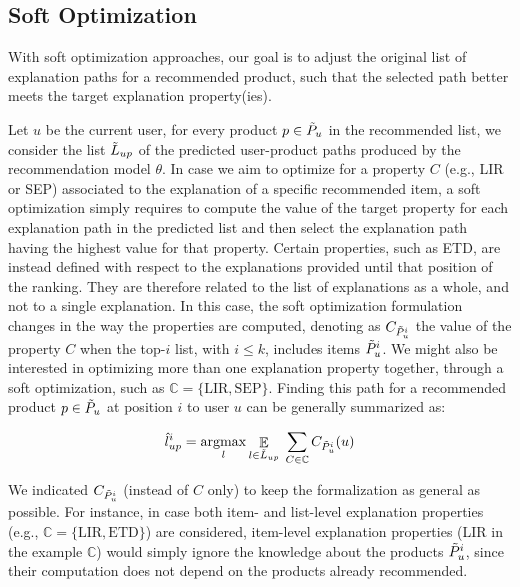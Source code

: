 \documentclass[sigconf]{acmart}
\begin{document}
\subsection{Soft Optimization}
With soft optimization approaches, our goal is to adjust the original list of explanation paths for a recommended product, such that the selected path better meets the target explanation property(ies).

Let $u$ be the current user, for every product $p \in \Tilde{P}_u$ in the recommended list, we consider the list $\Tilde{L}_{up}$ of the predicted user-product paths produced by the recommendation model $\theta$.
In case we aim to optimize for a property $C$ (e.g., LIR or SEP) associated to the explanation of a specific recommended item, a soft optimization simply requires to compute the value of the target property for each explanation path in the predicted list and then select the explanation path having the highest value for that property.
Certain properties, such as ETD, are instead defined with respect to the explanations provided until that position of the ranking.
They are therefore related to the list of explanations as a whole, and not to a single explanation.  
In this case, the soft optimization formulation changes in the way the properties are computed, denoting as $C_{\Tilde{P}_u^i}$ the value of the property $C$ when the top-$i$ list, with $i \leq k$, includes items $\Tilde{P}_u^i$. 
We might also be interested in optimizing more than one explanation property together, through a soft optimization, such as $\mathbb C = \{ \text{LIR}, \text{SEP} \}$. 
Finding this path for a recommended product $p \in \Tilde{P}_u$ at position $i$ to user $u$ can be generally summarized as: 

\vspace{-2mm}
\begin{equation}
\hat{l}_{up}^i = \underset{l}{\operatorname{argmax}} \mathop{\mathbb{E}}_{l \in \Tilde{L}_{up}} \; \sum_{C \in \mathbb C} C_{\Tilde{P}_u^i}(u)
\label{eq:soft-multiple}
\end{equation}

{\color {black} We indicated $C_{\Tilde{P}_u^i}$ (instead of $C$ only) to keep the formalization as general as possible. For instance, in case both item- and list-level explanation properties (e.g., $\mathbb C = \{ \text{LIR}, \text{ETD} \}$) are considered, item-level explanation properties (LIR in the example $\mathbb C$) would simply ignore the knowledge about the products $\Tilde{P}_u^i$, since their computation does not depend on the products already recommended. }
\end{document}
